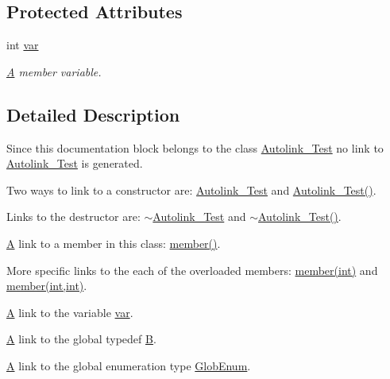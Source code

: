 \subsection*{Protected Attributes}
\begin{DoxyCompactItemize}
\item 
int \mbox{\hyperlink{class_autolink___test_a8de85603114bc9b9e53bd40764e9b499}{var}}
\begin{DoxyCompactList}\small\item\em \mbox{\hyperlink{class_a}{A}} member variable. \end{DoxyCompactList}\end{DoxyCompactItemize}


\subsection{Detailed Description}
Since this documentation block belongs to the class \mbox{\hyperlink{class_autolink___test}{Autolink\+\_\+\+Test}} no link to \mbox{\hyperlink{class_autolink___test}{Autolink\+\_\+\+Test}} is generated.

Two ways to link to a constructor are\+: \mbox{\hyperlink{class_autolink___test}{Autolink\+\_\+\+Test}} and \mbox{\hyperlink{class_autolink___test_a278d631f9943428c05b17d78f14488e2}{Autolink\+\_\+\+Test()}}.

Links to the destructor are\+: \mbox{\hyperlink{class_autolink___test_a03bf46c8e2b733680035f524fd7b193b}{$\sim$\+Autolink\+\_\+\+Test}} and \mbox{\hyperlink{class_autolink___test_a03bf46c8e2b733680035f524fd7b193b}{$\sim$\+Autolink\+\_\+\+Test()}}.

\mbox{\hyperlink{class_a}{A}} link to a member in this class\+: \mbox{\hyperlink{class_autolink___test_a393ea281f235a2f603d98daf72b0d411}{member()}}.

More specific links to the each of the overloaded members\+: \mbox{\hyperlink{class_autolink___test_a393ea281f235a2f603d98daf72b0d411}{member(int)}} and \mbox{\hyperlink{class_autolink___test_acf783a43c2b4b6cc9dd2361784eca2e1}{member(int,int)}}.

\mbox{\hyperlink{class_a}{A}} link to the variable \mbox{\hyperlink{class_autolink___test_a8de85603114bc9b9e53bd40764e9b499}{var}}.

\mbox{\hyperlink{class_a}{A}} link to the global typedef \mbox{\hyperlink{class_b}{B}}.

\mbox{\hyperlink{class_a}{A}} link to the global enumeration type \mbox{\hyperlink{autolink_8cpp_a656d63cf384d2a6f23c2c18523a7bc5e}{Glob\+Enum}}.

